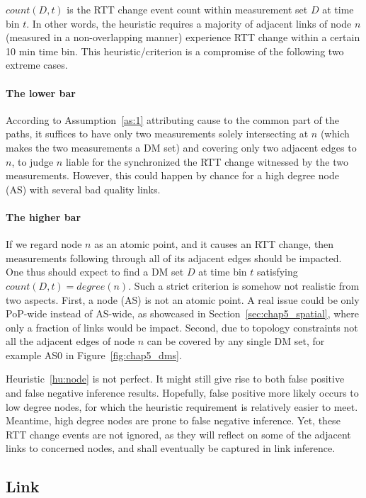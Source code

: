 $count(D,t)$ is the RTT change event count within measurement set $D$ at time bin $t$. In other words, the heuristic requires a majority of adjacent links of node $n$ (measured in a non-overlapping manner) experience RTT change within a certain 10 min time bin. This heuristic/criterion is a compromise of the following two extreme cases.

\paragraph{The lower bar} According to Assumption~\ref{as:1} attributing cause to the common part of the paths, it suffices to have only two measurements solely intersecting at $n$ (which makes the two measurements a \ac{DM} set) and covering only two adjacent edges to $n$, to judge $n$ liable for the synchronized the RTT change witnessed by the two measurements. However, this could happen by chance for a high degree node (AS) with several bad quality links.

\paragraph{The higher bar} If we regard node $n$ as an atomic point, and it causes an RTT change, then measurements following through all of its adjacent edges should be impacted. One thus should expect to find a \ac{DM} set $D$ at time bin $t$ satisfying $count(D, t) = degree(n)$. Such a strict criterion is somehow not realistic from two aspects. First, a node (AS) is not an atomic point. A real issue could be only PoP-wide instead of AS-wide, as showcased in Section~\ref{sec:chap5_spatial}, where only a fraction of links would be impact. Second, due to topology constraints not all the adjacent edges of node $n$ can be covered by any single \ac{DM} set, for example AS0 in Figure~\ref{fig:chap5_dms}.

Heuristic~\ref{hu:node} is not perfect. It might still give rise to both false positive and false negative inference results. Hopefully, false positive more likely occurs to low degree nodes, for which the heuristic requirement is relatively easier to meet. Meantime, high degree nodes are prone to false negative inference. Yet, these RTT change events are not ignored, as they will reflect on some of the adjacent links to concerned nodes, and shall eventually be captured in link inference.

\subsection{Link}

